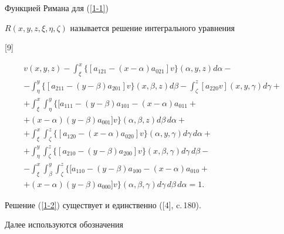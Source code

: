 Функцией Римана для (\ref{1-1})


$R(x,y,z,\xi,\eta,\zeta)$ называется решение интегрального уравнения


[9]


\begin{multline}\label{1-2}      %


v(x,y,z)-\int_{\xi}^{x}\{[a_{121}-(x-\alpha)a_{021}]v\}(\alpha,y,z)d\alpha -\\


%


-\int_{\eta}^{y}\{[a_{211}-(y-\beta)a_{201}]v\}(x,\beta,z)d\beta


-\int_{\zeta}^{z}[a_{220}v](x,y,\gamma)d\gamma +\\


%


+\int_{\xi}^{x}\int_{\eta}^{y}\{[a_{111}-(y-\beta)a_{101}


-(x-\alpha)a_{011}+ \\


%


+(x-\alpha)(y-\beta)a_{001}]v\}(\alpha,\beta,z)d\beta\, d\alpha+ \\


%


+\int_{\xi}^{x}\int_{\zeta}^{z}\{[a_{120}-(x-\alpha)a_{020}]v\}


(\alpha,y,\gamma)d\gamma\, d\alpha + \\


%


+\int_{\eta}^{y}\int_{\zeta}^{z}\{[a_{210}-(y-\beta)a_{200}]v\}


(x,\beta,\gamma)d\gamma\, d\beta -\\


%


-\int_{\xi}^{x}\int_{\beta}^{y}\int_{\zeta}^{z}


\{[a_{110}-(y-\beta)a_{100}-(x-\alpha)a_{010}+\\


%


+(x-\alpha)(y-\beta)a_{000}]v\}(\alpha,\beta,\gamma)


d\gamma\, d\beta\, d\alpha =1.


\end{multline}


Решение (\ref{1-2}) существует и единственно ([4], c.\,180).





Далее используются обозначения


